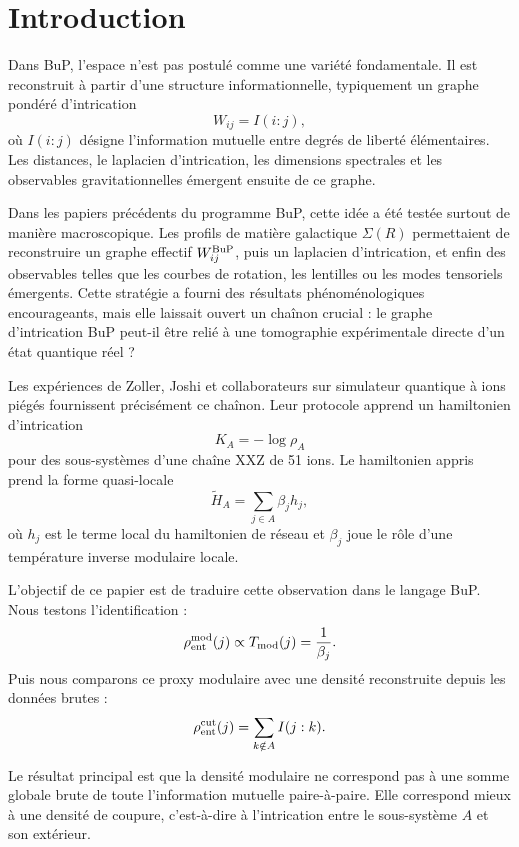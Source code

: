 \documentclass[11pt,a4paper]{article}
\begin{document}
\section{Introduction}

Dans BuP, l'espace n'est pas postulé comme une variété fondamentale. Il est reconstruit à partir d'une structure informationnelle, typiquement un graphe pondéré d'intrication
\[
W_{ij}=I(i:j),
\]
où $I(i:j)$ désigne l'information mutuelle entre degrés de liberté élémentaires. Les distances, le laplacien d'intrication, les dimensions spectrales et les observables gravitationnelles émergent ensuite de ce graphe.

Dans les papiers précédents du programme BuP, cette idée a été testée surtout de manière macroscopique. Les profils de matière galactique $\Sigma(R)$ permettaient de reconstruire un graphe effectif $W_{ij}^{\rm BuP}$, puis un laplacien d'intrication, et enfin des observables telles que les courbes de rotation, les lentilles ou les modes tensoriels émergents. Cette stratégie a fourni des résultats phénoménologiques encourageants, mais elle laissait ouvert un chaînon crucial : le graphe d'intrication BuP peut-il être relié à une tomographie expérimentale directe d'un état quantique réel ?

Les expériences de Zoller, Joshi et collaborateurs sur simulateur quantique à ions piégés fournissent précisément ce chaînon. Leur protocole apprend un hamiltonien d'intrication
\[
K_A=-\log\rho_A
\]
pour des sous-systèmes d'une chaîne XXZ de 51 ions. Le hamiltonien appris prend la forme quasi-locale
\[
\widetilde H_A
=
\sum_{j\in A}\beta_j h_j,
\]
où $h_j$ est le terme local du hamiltonien de réseau et $\beta_j$ joue le rôle d'une température inverse modulaire locale.

L'objectif de ce papier est de traduire cette observation dans le langage BuP. Nous testons l'identification :
\[
\rho_{\rm ent}^{\rm mod}(j)
\propto
T_{\rm mod}(j)
=
\frac{1}{\beta_j}.
\]
Puis nous comparons ce proxy modulaire avec une densité reconstruite depuis les données brutes :
\[
\rho_{\rm ent}^{\rm cut}(j)
=
\sum_{k\notin A}I(j:k).
\]

Le résultat principal est que la densité modulaire ne correspond pas à une somme globale brute de toute l'information mutuelle paire-à-paire. Elle correspond mieux à une densité de coupure, c'est-à-dire à l'intrication entre le sous-système $A$ et son extérieur.
\end{document}
